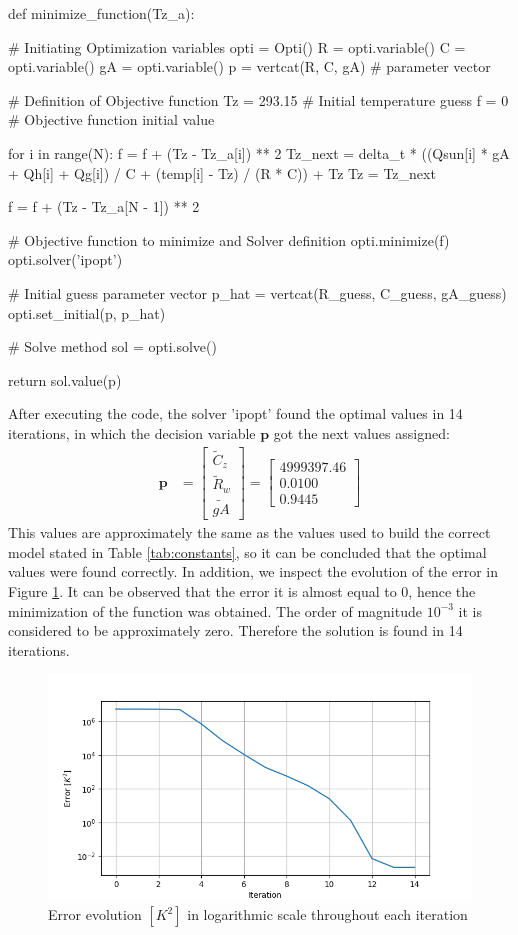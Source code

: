 \begin{python}
def minimize_function(Tz_a):
   
    # Initiating Optimization variables
    opti = Opti()
    R = opti.variable()
    C = opti.variable()
    gA = opti.variable()
    p = vertcat(R, C, gA)  # parameter vector

	  # Definition of Objective function
    Tz = 293.15  # Initial temperature guess
    f = 0   # Objective function initial value

    for i in range(N):
        f = f + (Tz - Tz_a[i]) ** 2
        Tz_next = delta_t * ((Qsun[i] * gA + Qh[i] + Qg[i]) / C + (temp[i] - Tz) / (R * C)) + Tz
        Tz = Tz_next
        
    f = f + (Tz - Tz_a[N - 1]) ** 2

	  # Objective function to minimize and Solver definition
    opti.minimize(f)
    opti.solver('ipopt')

    # Initial guess parameter vector
    p_hat = vertcat(R_guess, C_guess, gA_guess)
    opti.set_initial(p, p_hat)

	  # Solve method
    sol = opti.solve()

    return sol.value(p)
\end{python}
\newpage
After executing the code, the solver 'ipopt' found the optimal values in 14 iterations, in which the decision variable $\mathbf{p}$ got the next values assigned: 
\begin{align}
    \mathbf{p} &= \begin{bmatrix}
           \tilde{C}_z\\
           \tilde{R}_w \\
           \tilde{gA} 
         \end{bmatrix} = \begin{bmatrix}
           4999397.46\\
           0.0100\\
           0.9445 
         \end{bmatrix} 
  \end{align}
This values are approximately the same as the values used to build the correct model stated in Table \ref{tab:constants}, so it can be concluded that the optimal values were found correctly. In addition, we inspect the evolution of the error in Figure \ref{fig:Error Evolution}. It can be observed that the error it is almost equal to 0, hence the minimization of the function was obtained. The order of magnitude $10^{-3}$ it is considered to be approximately zero. Therefore the solution is found in 14 iterations.
\begin{figure}[H]
\centering
\includegraphics[scale=0.75]{images/Error_evolution_log.png}
\caption{Error evolution $[K^2]$ in logarithmic scale throughout each iteration}
\label{fig:Error Evolution}
\end{figure}